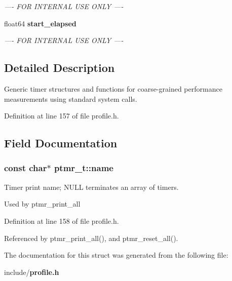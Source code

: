 \begin{CompactItemize}
\begin{CompactList}\small\item\em ---- FOR INTERNAL USE ONLY ---- \item\end{CompactList}\item 
float64 {\bf start\_\-elapsed}\label{structptmr__t_1702b16a6c6bcb82f6c636f5e68af188}

\begin{CompactList}\small\item\em ---- FOR INTERNAL USE ONLY ---- \item\end{CompactList}\end{CompactItemize}


\subsection{Detailed Description}
Generic timer structures and functions for coarse-grained performance measurements using standard system calls. 

Definition at line 157 of file profile.h.

\subsection{Field Documentation}
\subsubsection[{name}]{\setlength{\rightskip}{0pt plus 5cm}const char$\ast$ {\bf ptmr\_\-t::name}}\label{structptmr__t_73b51c5a047300d77b3a82a7dcaf44f1}


Timer print name; NULL terminates an array of timers. 

Used by ptmr\_\-print\_\-all 

Definition at line 158 of file profile.h.

Referenced by ptmr\_\-print\_\-all(), and ptmr\_\-reset\_\-all().

The documentation for this struct was generated from the following file:\begin{CompactItemize}
\item 
include/{\bf profile.h}\end{CompactItemize}
